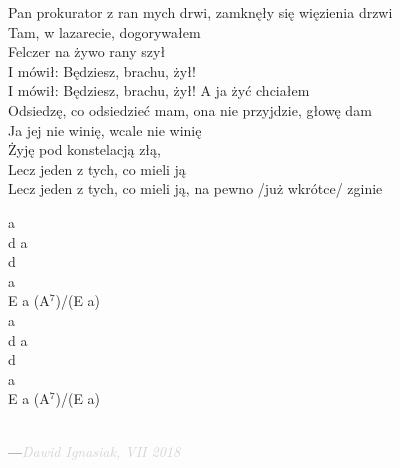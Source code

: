\documentclass[a5paper, 10pt]{book}
\begin{document}
\newpage
\begin{minipage}[t]{0.8\textwidth}
  Pan prokurator z ran mych drwi, zamknęły się więzienia drzwi\\
  Tam, w lazarecie, dogorywałem\\
  \hspace*{5mm}Felczer na żywo rany szył\\
  \hspace*{5mm}I mówił: Będziesz, brachu, żył!\\
  \hspace*{5mm}I mówił: Będziesz, brachu, żył! A ja żyć chciałem\\

  Odsiedzę, co odsiedzieć mam, ona nie przyjdzie, głowę dam\\
  Ja jej nie winię, wcale nie winię\\
  \hspace*{5mm}Żyję pod konstelacją złą,\\
  \hspace*{5mm}Lecz jeden z tych, co mieli ją\\
  \hspace*{5mm}Lecz jeden z tych, co mieli ją, na pewno /już wkrótce/ zginie\\
\end{minipage}
\begin{minipage}[t]{0.2\textwidth}
  a\\
  d a\\
  d\\
  a\\
  E a (A$^7$)/(E a)\\

  a\\
  d a\\
  d\\
  a\\
  E a (A$^7$)/(E a)\\
\end{minipage}
\vspace*{2cm}\\
---\hfill\textcolor{lightgray}{\textit{Dawid Ignasiak, VII 2018}}\\~\\
\end{document}
